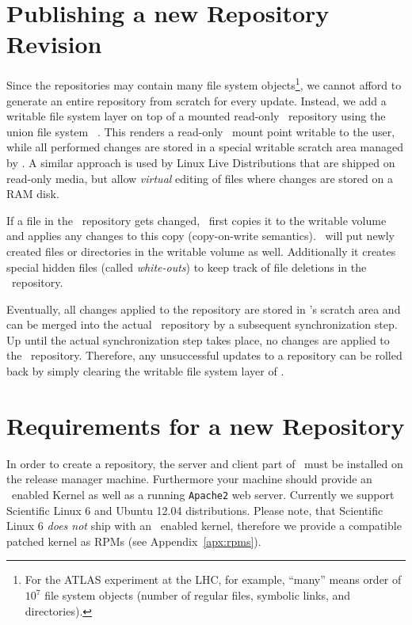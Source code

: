 \section{Publishing a new Repository Revision}
\label{sct:repoupdate}

Since the repositories may contain many file system objects\footnote{For the ATLAS experiment at the LHC, for example, ``many'' means order of $10^7$ file system objects (\ie number of regular files, symbolic links, and directories).}, we cannot afford to generate an entire repository from scratch for every update.
Instead, we add a writable file system layer on top of a mounted read-only \cvmfs\ repository using the union file system \aufs~\cite{aufs}.
This renders a read-only \cvmfs\ mount point writable to the user, while all performed changes are stored in a special writable scratch area managed by \aufs.
A similar approach is used by Linux Live Distributions that are shipped on read-only media, but allow \emph{virtual} editing of files where changes are stored on a RAM disk.

If a file in the \cvmfs\ repository gets changed, \aufs\ first copies it to the writable volume and applies any changes to this copy (copy-on-write semantics).
\aufs\ will put newly created files or directories in the writable volume as well.
Additionally it creates special hidden files (called \emph{white-outs}) to keep track of file deletions in the \cvmfs\ repository.

Eventually, all changes applied to the repository are stored in \aufs's scratch area and can be merged into the actual \cvmfs\ repository by a subsequent synchronization step.
Up until the actual synchronization step takes place, no changes are applied to the \cvmfs\ repository.
Therefore, any unsuccessful updates to a repository can be rolled back by simply clearing the writable file system layer of \aufs.

\section{Requirements for a new Repository}
\label{sct:newreporequirements}

In order to create a repository, the server and client part of \cvmfs\ must be installed on the release manager machine.
Furthermore your machine should provide an \aufs\ enabled Kernel as well as a running \texttt{Apache2} web server.
Currently we support Scientific Linux 6 and Ubuntu 12.04 distributions.
Please note, that Scientific Linux 6 \emph{does not} ship with an \aufs\ enabled kernel, therefore we provide a compatible patched kernel as RPMs (see Appendix~\ref{apx:rpms}).


